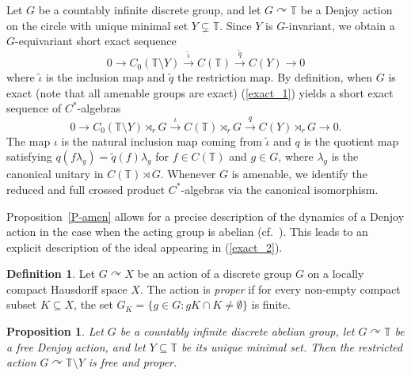 \documentclass[11pt,a4paper,leqno]{amsart}
\newtheorem{prop}[thm]{Proposition}
\theoremstyle{definition}
\newtheorem{df}[thm]{Definition}
\theoremstyle{remark}
\numberwithin{equation}{section}
\theoremstyle{plain}
\newcommand{\Tb}{\mathbb{T}}
\begin{document}
Let $G$ be a countably infinite discrete group, and let $G\curvearrowright \Tb$ be a Denjoy action on the circle with unique minimal set $Y\subsetneq \Tb$. Since $Y$ is $G$-invariant, we obtain a $G$-equivariant short exact sequence 
\begin{equation}
    0 \longrightarrow C_0(\Tb\setminus Y) \stackrel{\tilde{\iota}}{\longrightarrow} C(\Tb) \stackrel{\tilde{q}}{\longrightarrow} C(Y) \longrightarrow 0\label{exact_1}
\end{equation}
where $\tilde{\iota}$ is the inclusion map and $\tilde{q}$ the restriction map. By definition, when $G$ is exact (note that all amenable groups are exact) (\ref{exact_1}) yields a short exact sequence of $C^*$-algebras 
\begin{equation} 
    0 \longrightarrow C_0(\Tb\setminus Y)\rtimes_r G \stackrel{\iota}{\longrightarrow} C(\Tb)\rtimes_r G \stackrel{q}{\longrightarrow} C(Y)\rtimes_r G \longrightarrow 0.\label{exact_2}
\end{equation}
The map $\iota$ is the natural inclusion map coming from $\tilde{\iota}$ and $q$ is the quotient map satisfying $q(f\lambda_g) = \tilde{q}(f)\lambda_g$ for $f\in C(\Tb)$ and $g\in G$, where $\lambda_g$ is the canonical unitary in $C(\Tb)\rtimes G$. Whenever $G$ is amenable, we identify the reduced and full crossed product $C^*$-algebras via the canonical isomorphism. 

Proposition~\ref{P-amen} allows for a precise description of the dynamics of a Denjoy action in the case when the acting group is abelian (cf.\ \cite[\S 3]{PutSchSka86}). This leads to an explicit description of the ideal appearing in (\ref{exact_2}). 

\begin{df}\label{D-proper}
    Let $G\curvearrowright X$ be an action of a discrete group $G$ on a locally compact Hausdorff space $X$. The action is \emph{proper} if for every non-empty compact subset $K\subseteq X$, the set $G_K = \{g\in G : gK\cap K \ne \emptyset\}$ is finite. 
\end{df}

\begin{prop}\label{P-proper}
    Let $G$ be a countably infinite discrete abelian group, let $G\curvearrowright \Tb$ be a free Denjoy action, and let $Y\subseteq \Tb$ be its unique minimal set. Then the restricted action $G\curvearrowright \Tb\setminus {Y}$ is free and proper. 
\end{prop}
\end{document}
